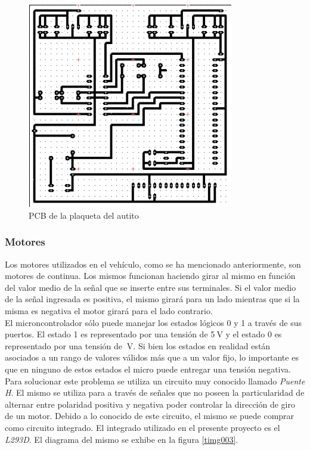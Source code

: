 \documentclass[a4paper,10pt]{article}
\begin{document}
					\begin{figure}[!htb]
						\centering
						\includegraphics[width=9cm]{Imagenes/PCBAutito.png}
						\caption{PCB de la plaqueta del autito} \label{timg002}
					\end{figure}


				\subsubsection{Motores}
					Los motores utilizados en el vehículo, como se ha mencionado anteriormente, son motores de continua. Los mismos funcionan haciendo girar 
					al mismo en función del valor medio de la señal que se inserte entre sus terminales. Si el valor medio de la señal ingresada es positiva, el mismo 
					girará para un lado mientras que si la misma es  negativa el motor girará para el lado contrario. \\
					\indent	El microncontrolador sólo puede manejar los estados lógicos 0 y 1 a través de sus puertos. El estado 1 es representado por una tensión de 
					5$~\text{V}$ y el estado 0 es representado por una tensión de $~\text{V}$. Si bien los estados en realidad están asociados a un rango de valores 
					válidos más que a un valor fijo, lo importante es que en ninguno de estos estados el micro puede entregar una tensión negativa.
					\indent Para solucionar este problema se utiliza un circuito muy conocido llamado \emph{Puente H}. El mismo se utiliza para a través de 
					señales que no poseen la particularidad de alternar entre polaridad positiva y negativa poder controlar la dirección de giro de un motor. Debido a 
					lo conocido de este circuito, el mismo se puede comprar como circuito integrado. El integrado utilizado en el presente proyecto es el 
					\emph{L293D}. El diagrama del mismo se exhibe en la figura \ref{timg003}.	  
\end{document}
